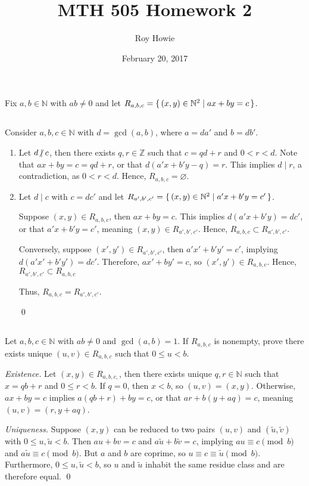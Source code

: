 \documentclass{article}
\newcommand{\N}{\mathbb{N}}
\newcommand{\Z}{\mathbb{Z}}
\begin{document}
\title{\vspace{-2.05cm}MTH 505 Homework 2}
\author{Roy Howie}
\date{February 20, 2017}
\maketitle

Fix $a,b\in\N$ with $ab\ne0$ and let $R_{a,b,c}=\set{(x,y)\in\N^2\mid ax+by=c}$.

\subsection{} %
  Consider $a,b,c\in\N$ with $d=\gcd(a,b)$, where $a=da'$ and $b=db'$.
  \begin{enumerate}[label=\textbf{(\alph*)}]
    \item{
      Let $d\centernot\mid c$, then there exists $q,r\in\Z$ such that $c=qd+r$
      and $0<r<d$. Note that $ax+by=c=qd+r$, or that $d(a'x+b'y-q)=r$. This
      implies $d\mid r$, a contradiction, as $0<r<d$. Hence, $R_{a,b,c}=
      \varnothing$.
    }
    \item{
      Let $d\mid c$ with $c=dc'$ and let $R_{a',b',c'}=\set{(x,y)\in\N^2\mid
      a'x+b'y=c'}$.

      Suppose $(x,y)\in R_{a,b,c}$, then $ax+by=c$. This implies
      $d(a'x+b'y)=dc'$, or that $a'x+b'y=c'$, meaning $(x,y)\in R_{a',b',c'}$.
      Hence, $R_{a,b,c}\subset R_{a',b',c'}$.

      Conversely, suppose $(x',y')\in R_{a',b',c'}$, then $a'x'+b'y'=c'$,
      implying $d(a'x'+b'y')=dc'$. Therefore, $ax'+by'=c$, so
      $(x',y')\in R_{a,b,c}$. Hence, $R_{a',b',c'}\subset R_{a,b,c}$

      Thus, $R_{a,b,c}=R_{a',b',c'}$.
    }
    \qed
  \end{enumerate}

\subsection{} %
  Let $a,b,c\in\N$ with $ab\ne0$ and $\gcd(a,b)=1$. If $R_{a,b,c}$ is nonempty,
  prove there exists unique $(u,v)\in R_{a,b,c}$ such that $0\leq u<b$.

  \textit{Existence.}
  Let $(x,y)\in R_{a,b,c,}$, then there exists unique $q,r\in\N$ such that
  $x=qb+r$ and $0\leq r<b$. If $q=0$, then $x<b$, so $(u,v)=(x,y)$. Otherwise,
  $ax+by=c$ implies $a(qb+r)+by=c$, or that $ar+b(y+aq)=c$, meaning
  $(u,v)=(r,y+aq)$.

  \textit{Uniqueness.}
  Suppose $(x,y)$ can be reduced to two pairs $(u,v)$ and $(\tilde{u},
  \tilde{v})$ with $0\leq u,\tilde{u}<b$. Then $au+bv=c$ and $a\tilde{u}+b
  \tilde{v}=c$, implying $au\equiv c\pmod{b}$ and $a\tilde{u}\equiv c\pmod{b}$.
  But $a$ and $b$ are coprime, so $u\equiv c\equiv\tilde{u}\pmod{b}$.
  Furthermore, $0\leq u,\tilde{u}<b$, so $u$ and $\tilde{u}$ inhabit the same
  residue class and are therefore equal.
  \qed
\end{document}
